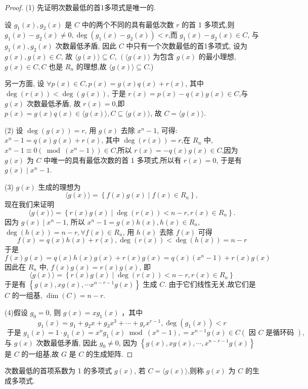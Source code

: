 \begin{proof}
  (1) 先证明次数最低的首1多项式是唯一的.
  
设 $ g_{1}(x), g_{2}(x) $ 是 $ C $ 中的两个不同的具有最低次数 $ r $ 的首 1 多项式,则 $ g_{1}(x)-g_{2}(x) \neq 0, \operatorname{deg}\left(g_{1}(x)-g_{2}(x)\right)<r $,而 $ g_{1}(x)-g_{2}(x) \in C $, 与 $ g_{1}(x), g_{2}(x) $ 次数最低矛盾, 因此 $ C $ 中只有一个次数最低的首1多项式, 设为 $ g(x), g(x) \in C $, 故 $ \langle g(x)\rangle \subseteq C $, $ \left(\langle g(x)\rangle\right. $ 为包含 $ g(x) $ 的最小理想, $ g(x) \in C, C $ 也是 $ R_{n} $ 的理想,故 $ \langle g(x)\rangle \subseteq C $.)

另一方面, 设 $ \forall p(x) \in C, p(x)=g(x) q(x)+r(x) $, 其中 $ \operatorname{deg}(r(x))<\operatorname{deg}(g(x)) $, 于是 $ r(x)=p(x)-q(x) g(x) \in C $,与 $ g(x) $ 次数最低矛盾, 故 $ r(x)=0 $,即 $ p(x)=g(x) q(x) \in\langle g(x)\rangle, C \subseteq\langle g(x)\rangle $, 故 $ C=\langle g(x)\rangle $.

(2) 设 $ \operatorname{deg}(g(x))=r $, 用 $ g(x) $ 去除 $ x^{n}-1 $, 可得: $ x^{n}-1=q(x) g(x)+r(x) $, 其中 $ \operatorname{deg}(r(x))=r $,在 $ R_{n} $ 中, $ x^{n}-1 \equiv 0\left(\bmod \left(x^{n}-1\right)\right) \in C $,所以 $ r(x)=-q(x) g(x) \in C $,因为 $ g(x) $ 为 $ C $ 中唯一的具有最低次数的首 1 多项式,所以有 $ r(x)=0 $, 于是有 $ g(x) \mid x^{n}-1 $.

(3) $ g(x) $ 生成的理想为
$$
\langle g(x)\rangle=\left\{f(x) g(x) \mid f(x) \in R_{n}\right\},
$$
现在我们来证明
$$
\langle g(x)\rangle=\left\{r(x) g(x) \mid \operatorname{deg}(r(x))<n-r, r(x) \in R_{n}\right\} .
$$
因为 $ g(x) \mid x^{n}-1 $, 所以 $ x^{n}-1=g(x) h(x), h(x) \in R_{n} $, $ \operatorname{deg}(h(x))=n-r, \forall f(x) \in R_{n} $, 用 $ h(x) $ 去除 $ f(x) $ 可得
$$
f(x)=q(x) h(x)+r(x), \operatorname{deg}(r(x))<\operatorname{deg}(h(x))=n-r
$$
于是 $ f(x) g(x)=q(x) h(x) g(x)+r(x) g(x)=q(x)\left(x^{n}-1\right)+r(x) g(x)$
因此在 $ R_{n} $ 中, $ f(x) g(x)=r(x) g(x) $, 即
$$
\langle g(x)\rangle=\left\{r(x) g(x) \mid \operatorname{deg}(r(x))<n-r, r(x) \in R_{n}\right\}
$$
于是有 $ \left\{g(x), x g(x), \cdots x^{n-r-1} g(x)\right\} $ 生成 $ C $. 由于它们线性无关,故它们是 $ C $ 的一组基, $ \operatorname{dim}(C)=n-r $.

(4)假设 $ g_{0}=0 $, 则 $ g(x)=x g_{1}(x) $ ，其中
$$g_{1}(x)=g_{1}+g_{2} x+g_{3} x^{3}+\cdots+g_{r} x^{r-1}, \operatorname{deg}\left(g_{1}(x)\right)<r $$
$\text { 于是 } g_{1}(x)=1 \cdot g_{1}(x)=x^{n} g_{1}(x) \bmod \left(x^{n}-1\right),
=x^{n-1} g(x) \in C(\text { 因 } C \text { 是循环码 }),$
与 $ g(x) $ 次数最低矛盾, 因此 $ g_{0} \neq 0 $,
因为 $ \left\{g(x), x g(x), \cdots, x^{n-r-1} g(x)\right\} $ 是 $ C $ 的一组基,故 $ G $ 是 $ C $ 的生成矩阵.
\end{proof}
\begin{remark}
 次数最低的首项系数为 1 的多项式 $ g(x) $, 若 $ C=\langle g(x)\rangle $,则称 $ g(x) $ 为 $ C $ 的生成多项式.
\end{remark}

